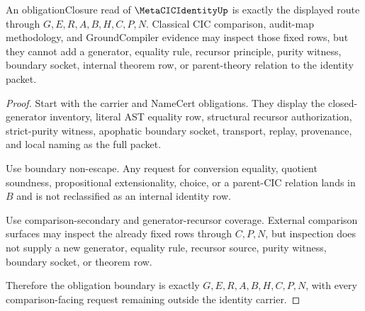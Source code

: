 \begin{theorem}
\label{thm:metacic-identity-obligation-boundary}
An obligationClosure read of $\MetaCICIdentityUp$ is exactly the displayed route through $G,E,R,A,B,H,C,P,N$. Classical CIC comparison, audit-map methodology, and GroundCompiler evidence may inspect those fixed rows, but they cannot add a generator, equality rule, recursor principle, purity witness, boundary socket, internal theorem row, or parent-theory relation to the identity packet.
\end{theorem}
\begin{proof}
Start with the carrier and NameCert obligations. They display the closed-generator inventory, literal AST equality row, structural recursor authorization, strict-purity witness, apophatic boundary socket, transport, replay, provenance, and local naming as the full packet.

Use boundary non-escape. Any request for conversion equality, quotient soundness, propositional extensionality, choice, or a parent-CIC relation lands in $B$ and is not reclassified as an internal identity row.

Use comparison-secondary and generator-recursor coverage. External comparison surfaces may inspect the already fixed rows through $C,P,N$, but inspection does not supply a new generator, equality rule, recursor source, purity witness, boundary socket, or theorem row.

Therefore the obligation boundary is exactly $G,E,R,A,B,H,C,P,N$, with every comparison-facing request remaining outside the identity carrier.
\end{proof}

